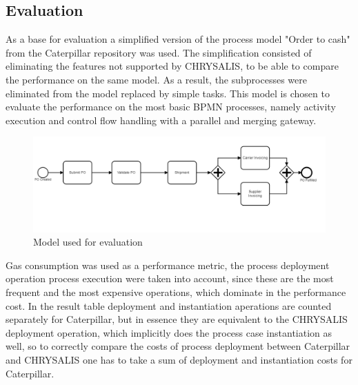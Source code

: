 \subsection{Evaluation}
\label{sec:caterpillar:eval:eval}

As a base for evaluation a simplified version of the process model "Order to cash" from the Caterpillar repository was used. The simplification consisted of eliminating the features not supported by CHRYSALIS, to be able to compare the performance on the same model. As a result, the subprocesses were eliminated from the model replaced by simple tasks. This model is chosen to evaluate the performance on the most basic BPMN processes, namely activity execution and control flow handling with a parallel and merging gateway.

\begin{figure}[hbt]
	\includegraphics[width=\textwidth]{gfx/caterpillar-eval-model}
	\caption{Model used for evaluation}
	\label{fig:caterpillar:eval:model}
\end{figure}

Gas consumption was used as a performance metric, the process deployment operation process execution were taken into account, since these are the most frequent and the most expensive operations, which dominate in the performance cost. In the result table deployment and instantiation aperations are counted separately for Caterpillar, but in essence they are equivalent to the CHRYSALIS deployment operation, which implicitly does the process case instantiation as well, so to correctly compare the costs of process deployment between Caterpillar and CHRYSALIS one has to take a sum of deployment and instantiation costs for Caterpillar.

